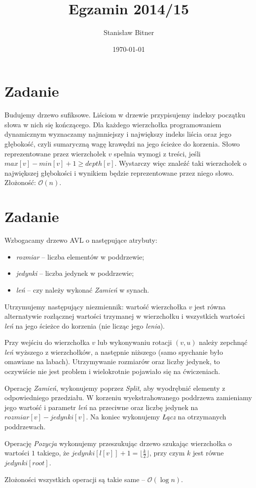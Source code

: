 \documentclass[12pt, a4paper]{article}
\title{Egzamin 2014/15}
\author{Stanisław Bitner}
\date{\today}
\newcommand{\MCALO}{\mathcal{O}}
\newcounter{zadanie}
\newcommand{\zadanie}{\addtocounter{zadanie}{1}\section*{Zadanie \arabic{zadanie}}}
\begin{document}
\maketitle
\zadanie{}
Budujemy drzewo sufiksowe. Liściom w drzewie przypisujemy indeksy początku
słowa w nich się kończącego. Dla każdego wierzchołka programowaniem dynamicznym
wyznaczamy najmniejszy i największy indeks liścia oraz jego głębokość, czyli
sumaryczną wagę krawędzi na jego ścieżce do korzenia. Słowo reprezentowane
przez wierzchołek $v$ spełnia wymogi z treści, jeśli $max[v] - min[v] + 1 \ge
depth[v]$. Wystarczy więc znaleźć taki wierzchołek o największej głębokości
i wynikiem będzie reprezentowane przez niego słowo.
Złożoność: $\MCALO(n)$.

\zadanie{}
Wzbogacamy drzewo AVL o następujące atrybuty:
\begin{itemize}
  \item \textit{rozmiar} -- liczba elementów w poddrzewie;
  \item \textit{jedynki} -- liczba jedynek w poddrzewie;
  \item \textit{leń} -- czy należy wykonać \textit{Zamień} w synach.
\end{itemize}

Utrzymujemy następujący niezmiennik: wartość wierzchołka $v$ jest równa
alternatywie rozłącznej wartości trzymanej w wierzchołku i wszystkich wartości
\textit{leń} na jego ścieżce do korzenia (nie licząc jego \textit{lenia}).

Przy wejściu do wierzchołka $v$ lub wykonywaniu rotacji $(v,u)$ należy zepchnąć
\textit{leń} wyższego z wierzchołków, a następnie niższego (samo spychanie było
omawiane na labach). Utrzymywanie rozmiarów oraz liczby jedynek, to oczywiście
nie jest problem i wielokrotnie pojawiało się na ćwiczeniach.

Operację \textit{Zamień}, wykonujemy poprzez \textit{Split}, aby wyodrębnić elementy
z odpowiedniego przedziału. W korzeniu wyekstrahowanego poddrzewa zamieniamy
jego wartość i parametr \textit{leń} na przeciwne oraz liczbę jedynek na
$rozmiar[v] - jedynki[v]$. Na koniec wykonujemy \textit{Łącz} na otrzymanych
poddrzewach.

Operację \textit{Pozycja} wykonujemy przeszukując drzewo szukając wierzchołka
o wartości $1$ takiego, że $\mathit{jedynki}[l[v]]
+ 1 = \lfloor\frac{k}{2}\rfloor$, przy czym $k$ jest równe
$\mathit{jedynki}[root]$.

Złożoności wszystkich operacji są takie same -- $\MCALO(\log{n})$.
\end{document}
